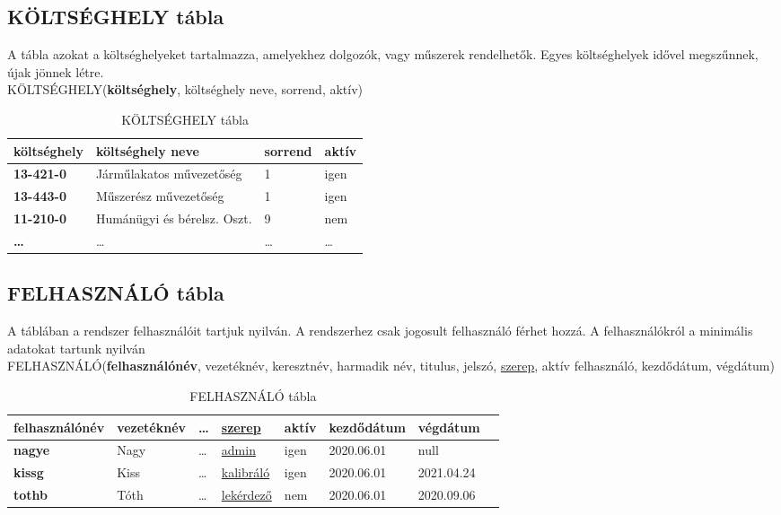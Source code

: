 \documentclass[a4paper,12pt]{report}
\newcommand{\pk}[1]{\textbf{#1}} %
\newcommand{\fk}[1]{\underline{#1}} %
\newcommand{\tabla}[1]{\noindent\MakeUppercase{#1}} %
\begin{document}
\subsection{KÖLTSÉGHELY tábla}
A tábla azokat a költséghelyeket tartalmazza, amelyekhez dolgozók, vagy 
műszerek rendelhetők. Egyes költséghelyek idővel megszűnnek, újak jönnek
létre.\\

\tabla{KÖLTSÉGHELY}(\pk{költséghely}, költséghely neve, sorrend, aktív)


\begin{table}[ht!]
\centering
	\begin{footnotesize}
\begin{tabular}[t]{|l|l|l|l|}
\hline
 \textbf{költséghely}&költséghely neve&sorrend&aktív\\ \hline
 \textbf{13-421-0}&Járműlakatos művezetőség&1&igen\\
 \textbf{13-443-0}&Műszerész művezetőség&1&igen\\
 \textbf{11-210-0}&Humánügyi és bérelsz. Oszt.&9&nem\\
 \textbf{\dots}&\dots&\dots&\dots \\
\end{tabular}
\end{footnotesize}
\caption{KÖLTSÉGHELY tábla} \label{tabKOLTSEGHELY}
\end{table}


\subsection{FELHASZNÁLÓ tábla}
A táblában a rendszer felhasználóit tartjuk nyilván. A rendszerhez csak 
jogosult felhasználó férhet hozzá. A felhasználókról a minimális adatokat 
tartunk nyilván\\

\tabla{felhasználó}(\pk{felhasználónév}, vezetéknév, keresztnév, 
harmadik név, titulus, jelszó, \fk{szerep}, aktív felhasználó, kezdődátum, végdátum)


\begin{table}[ht!]
 \centering
 \begin{footnotesize}
 \begin{tabular}[t]{|l|l|l|l|l|l|l|l|}
  \hline
\textbf{felhasználónév}&vezetéknév&\dots&\fk{szerep}
&aktív&kezdődátum&végdátum\\ \hline
  \textbf{nagye}&Nagy&\dots&\fk{admin}&igen&2020.06.01&null \\
  \textbf{kissg}&Kiss&\dots&\fk{kalibráló}&igen&2020.06.01&2021.04.24\\
  \textbf{tothb}&Tóth&\dots&\fk{lekérdező}&nem&2020.06.01&2020.09.06\\
 \end{tabular}
\end{footnotesize}
\caption{FELHASZNÁLÓ tábla}\label{tabFEHASZNALO}
\end{table}
\end{document}

